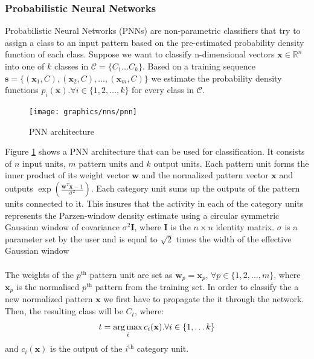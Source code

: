 	
	\subsubsection{Probabilistic Neural Networks}
 	Probabilistic Neural Networks (PNNs) are non-parametric classifiers that try to assign a class to an input pattern based on the pre-estimated probability density function of each class. Suppose we want to classify n-dimensional vectors $\mathbf{x} \in \mathbb{R}^n$ into one of $k$ classes in $\mathcal{C}=\{C_1\dots C_k\}$. Based on a training sequence $\mathbf{s} = \{ (\mathbf{x}_1, C), (\mathbf{x}_2, C), \dots ,(\mathbf{x}_m, C)\}$ we estimate the probability density functions $p_i(\mathbf{x}). \forall i \in \{1,2,\dots,k \}$ for every class in $\mathcal{C}$. 

  	\begin{figure}[H]
 		\centering
 		\texttt{[image: graphics/nns/pnn]}
 		\caption{PNN architecture}
 		\label{Fig 2.8}
 	\end{figure}
	 
	 Figure \ref{Fig 2.8} shows a PNN architecture that can be used for classification. It consists of $n$ input units, $m$ pattern units and $k$ output units. Each pattern unit forms the inner product of its weight vector $\mathbf{w}$ and the normalized pattern vector $\mathbf{x}$ and outputs $\exp(\frac{\mathbf{w}^T\mathbf{x} - 1}{\sigma^2})$. Each category unit sums up the outputs of the pattern units connected to it. This insures that the activity in each of the category units represents the Parzen-window density estimate using a circular symmetric Gaussian window of covariance $\sigma^2\mathbf{I}$, where $\mathbf{I}$ is the $n\times n$ identity matrix. $\sigma$ is a parameter set by the user and is equal to $\sqrt{2}$ times the width of the effective Gaussian window
     \\ \\ 
	 The weights of the $p^\text{th}$ pattern unit are set as $\mathbf{w}_p = \mathbf{x}_p$, $\forall p \in \{ 1,2,\dots ,m \}$, where $\mathbf{x}_p$ is the normalised $p^\text{th}$ pattern from the training set. In order to classify the a new normalized pattern $\mathbf{x}$ we first have to propagate the it through the network. Then, the resulting class will be $C_t$, where:
	 \begin{equation}
		 t = \operatorname*{arg\,max}_i c_i(\mathbf{x}). \forall i \in \{1,\dots k\}
	 \end{equation}
	 and $c_i(\mathbf{x})$ is the output of the $i^\text{th}$ category unit.
